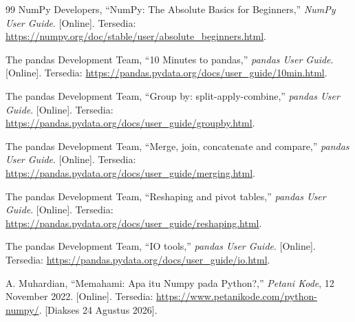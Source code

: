 \documentclass[a4paper,oneside,12pt]{report}
\renewcommand{\bibname}{Daftar Pustaka}
\begin{document}
\clearpage
{}
\renewcommand{\bibname}{Daftar Pustaka}
\begin{thebibliography}{99}
     NumPy Developers, ``NumPy: The Absolute Basics for Beginners,''
    \textit{NumPy User Guide}. [Online]. Tersedia:
    \url{https://numpy.org/doc/stable/user/absolute_beginners.html}.

     The pandas Development Team, ``10 Minutes to pandas,''
    \textit{pandas User Guide}. [Online]. Tersedia:
    \url{https://pandas.pydata.org/docs/user_guide/10min.html}.

     The pandas Development Team, ``Group by: split-apply-combine,''
    \textit{pandas User Guide}. [Online]. Tersedia:
    \url{https://pandas.pydata.org/docs/user_guide/groupby.html}.

     The pandas Development Team, ``Merge, join, concatenate and compare,''
    \textit{pandas User Guide}. [Online]. Tersedia:
    \url{https://pandas.pydata.org/docs/user_guide/merging.html}.

     The pandas Development Team, ``Reshaping and pivot tables,''
    \textit{pandas User Guide}. [Online]. Tersedia:
    \url{https://pandas.pydata.org/docs/user_guide/reshaping.html}.

     The pandas Development Team, ``IO tools,''
    \textit{pandas User Guide}. [Online]. Tersedia:
    \url{https://pandas.pydata.org/docs/user_guide/io.html}.

     A. Muhardian, ``Memahami: Apa itu Numpy pada Python?,''
    \textit{Petani Kode}, 12 November 2022. [Online]. Tersedia:
    \url{https://www.petanikode.com/python-numpy/}. [Diakses 24 Agustus 2026].
\end{thebibliography}
\end{document}
